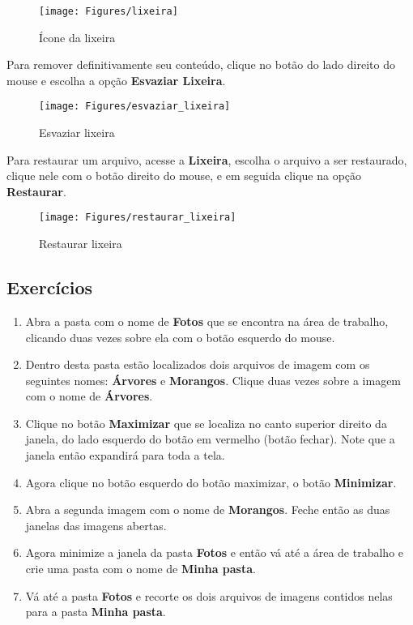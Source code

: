 \documentclass[hidelinks,12pt]{article}
\begin{document}
		\begin{figure}[!h]
			\centering
			\texttt{[image: Figures/lixeira]}
			\caption{Ícone da lixeira}
			\label{fig:lixeira}
		\end{figure}
		\newpage
		Para remover definitivamente seu conteúdo, clique no botão do lado direito do mouse e escolha a opção {\bf Esvaziar Lixeira}.

		\begin{figure}[!h]
			\centering
			\texttt{[image: Figures/esvaziar\_lixeira]}
			\caption{Esvaziar lixeira}
			\label{fig:esvaziar_lixeira}
		\end{figure}

		Para restaurar um arquivo, acesse a {\bf Lixeira}, escolha o arquivo a ser restaurado, clique nele com o botão direito do mouse, e em seguida clique na opção {\bf Restaurar}.

		\begin{figure}[!h]
			\centering
			\texttt{[image: Figures/restaurar\_lixeira]}
			\caption{Restaurar lixeira}
			\label{fig: restaurar_lixeira}
		\end{figure}

		\subsection{Exercícios}

		\begin{enumerate}

			\item Abra a pasta com o nome de {\bf Fotos} que se encontra na área de trabalho, clicando duas vezes sobre ela com o botão esquerdo do mouse.


			\item Dentro desta pasta estão localizados dois arquivos de imagem com os seguintes nomes: {\bf Árvores} e {\bf Morangos}. Clique duas vezes sobre a imagem com o nome de {\bf Árvores}.

			\item Clique no botão {\bf Maximizar} que se localiza no canto superior direito da janela, do lado esquerdo do botão em vermelho (botão fechar). Note que a janela então expandirá para toda a tela.

			\item Agora clique no botão esquerdo do botão maximizar, o botão {\bf Minimizar}.

			\item Abra a segunda imagem com o nome de {\bf Morangos}. Feche então as duas janelas das imagens abertas.

			\item Agora minimize a janela da pasta {\bf Fotos} e então vá até a área de trabalho e crie uma pasta com o nome de {\bf Minha pasta}.

			\item Vá até a pasta {\bf Fotos} e recorte os dois arquivos de imagens contidos nelas para a pasta {\bf Minha pasta}.

		\end{enumerate}
\end{document}
